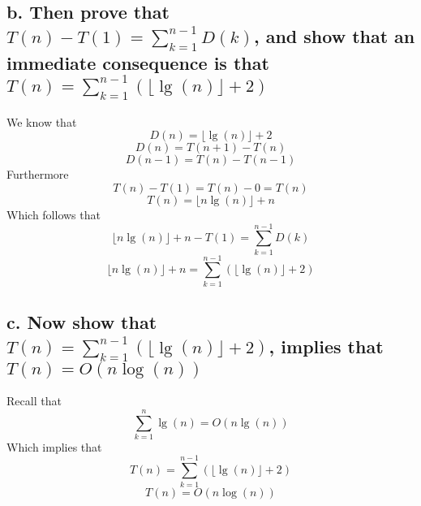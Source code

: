 \documentclass{article}
\begin{document}
    \subsection*{b. Then prove that \(T(n) - T(1) = \sum_{k=1}^{n-1} D(k)\), and show that an immediate consequence is that \(T(n) = \sum_{k=1}^{n-1} (\lfloor\lg{(n)}\rfloor + 2)\)}
    We know that
    \[D(n) = \lfloor \lg{(n)} \rfloor + 2\]
    \[D(n) = T(n + 1) - T(n)\]
    \[D(n - 1) = T(n) - T(n - 1)\]
    Furthermore
    \[T(n) - T(1) = T(n) - 0 = T(n)\]
    \[T(n) = \lfloor n\lg{(n)} \rfloor + n\]
    Which follows that
    \[\lfloor n\lg{(n)} \rfloor + n - T(1) = \sum_{k=1}^{n-1} D(k)\]
    \[\lfloor n\lg{(n)} \rfloor + n = \sum_{k=1}^{n-1} (\lfloor\lg{(n)}\rfloor + 2)\]
    \subsection*{c. Now show that \(T(n) = \sum_{k=1}^{n-1} (\lfloor\lg{(n)}\rfloor + 2)\), implies that \(T(n) = O(n\log{(n)})\)}
    Recall that
    \[\sum_{k=1}^{n} \lg{(n)} = O(n\lg{(n)})\]
    Which implies that
    \[T(n) = \sum_{k=1}^{n-1} (\lfloor\lg{(n)}\rfloor + 2)\]
    \[T(n) = O(n\log{(n)})\]
\end{document}
